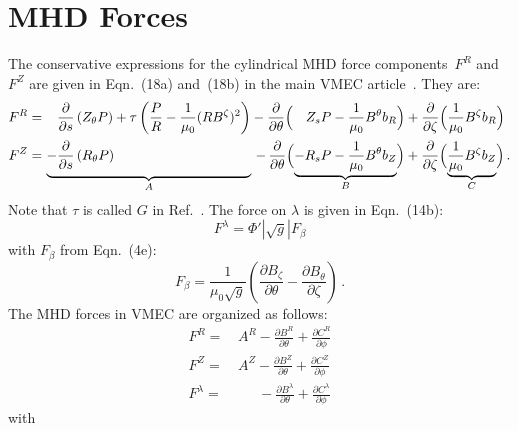 \FloatBarrier
\section{MHD Forces}
The conservative expressions for the cylindrical MHD force components~$F^R$ and~$F^Z$
are given in Eqn.~(18a) and~(18b) in the main VMEC article~\cite{hirshman_whitson_1983}.
They are:
\begin{align}
 F^R =&\, \phantom{-}\, \frac{\partial}{\partial s} \left( Z_\theta P \right) + \tau \left( \frac{P}{R} - \frac{1}{\mu_0} (R B^\zeta)^2 \right)
          - \frac{\partial}{\partial \theta} \Bigl(\phantom{-}\, Z_s P - \frac{1}{\mu_0} B^\theta b_R \Bigr)
          + \frac{\partial}{\partial \zeta}  \Bigl( \frac{1}{\mu_0} B^\zeta b_R \Bigr) \nonumber \\
 F^Z =&\, \underbrace{-\frac{\partial}{\partial s} \left( R_\theta P \right) \phantom{+ G \left( \frac{P}{R} - \frac{1}{\mu_0} (R B^\zeta)^2 \right)}}_{A}\,
          - \, \frac{\partial}{\partial \theta} \Bigl( \underbrace{- R_s P - \frac{1}{\mu_0} B^\theta b_Z}_{B} \Bigr)
          + \frac{\partial}{\partial \zeta}  \Bigl( \underbrace{\frac{1}{\mu_0} B^\zeta b_Z }_{C} \Bigr) \nonumber \, .
\end{align}
Note that $\tau$ is called $G$ in Ref.~\cite{hirshman_whitson_1983}.
The force on $\lambda$ is given in Eqn.~(14b):
\begin{equation}
 F^\lambda = \Phi' |\sqrt{g}| F_\beta
\end{equation}
with $F_\beta$ from Eqn.~(4e):
\begin{equation}
 F_\beta = \frac{1}{\mu_0 \sqrt{g}} \left( \frac{\partial B_\zeta}{\partial \theta} - \frac{\partial B_\theta}{\partial \zeta} \right) \, .
\end{equation}
The MHD forces in VMEC are organized as follows:
\begin{align}
  F^R       =&\,          A^R    - \frac{\partial B^R      }{\partial \theta} + \frac{\partial C^R      }{\partial \phi} \nonumber \\
  F^Z       =&\,          A^Z    - \frac{\partial B^Z      }{\partial \theta} + \frac{\partial C^Z      }{\partial \phi} \label{eqn:mhd_forces} \\
  F^\lambda =&\, \phantom{A^Z}\, - \frac{\partial B^\lambda}{\partial \theta} + \frac{\partial C^\lambda}{\partial \phi} \nonumber
\end{align}
with
